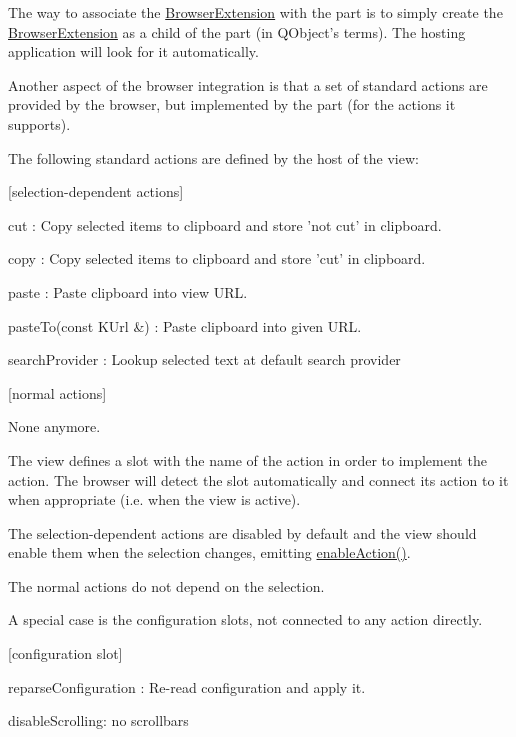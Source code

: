 \-The way to associate the \hyperlink{classKParts_1_1BrowserExtension}{\-Browser\-Extension} with the part is to simply create the \hyperlink{classKParts_1_1BrowserExtension}{\-Browser\-Extension} as a child of the part (in \-Q\-Object's terms). \-The hosting application will look for it automatically.

\-Another aspect of the browser integration is that a set of standard actions are provided by the browser, but implemented by the part (for the actions it supports).

\-The following standard actions are defined by the host of the view\-:

\mbox{[}selection-\/dependent actions\mbox{]} \begin{DoxyItemize}
\item {\ttfamily cut} \-: \-Copy selected items to clipboard and store 'not cut' in clipboard. \item {\ttfamily copy} \-: \-Copy selected items to clipboard and store 'cut' in clipboard. \item {\ttfamily paste} \-: \-Paste clipboard into view \-U\-R\-L. \item {\ttfamily paste\-To(const K\-Url \&)} \-: \-Paste clipboard into given \-U\-R\-L. \item {\ttfamily search\-Provider} \-: \-Lookup selected text at default search provider\end{DoxyItemize}
\mbox{[}normal actions\mbox{]} \begin{DoxyItemize}
\item \-None anymore.\end{DoxyItemize}
\-The view defines a slot with the name of the action in order to implement the action. \-The browser will detect the slot automatically and connect its action to it when appropriate (i.\-e. when the view is active).

\-The selection-\/dependent actions are disabled by default and the view should enable them when the selection changes, emitting \hyperlink{classKParts_1_1BrowserExtension_a3252f2adebd103519ee15e57037c7386}{enable\-Action()}.

\-The normal actions do not depend on the selection.

\-A special case is the configuration slots, not connected to any action directly.

\mbox{[}configuration slot\mbox{]} \begin{DoxyItemize}
\item {\ttfamily reparse\-Configuration} \-: \-Re-\/read configuration and apply it. \item {\ttfamily disable\-Scrolling\-:} no scrollbars \end{DoxyItemize}


